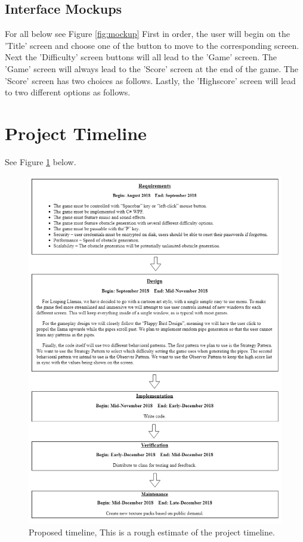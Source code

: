 \documentclass[10pt,conference,onecolumn,compsoc]{IEEEtran}
\begin{document}
\subsection{Interface Mockups}
For all below see Figure \ref{fig:mockup}
First in order, the user will begin on the 'Title' screen and choose one of the button to move to the corresponding screen. Next the 'Difficulty' screen buttons will all lead to the 'Game' screen. The 'Game' screen will always lead to the 'Score' screen at the end of the game. The 'Score' screen has two choices as follows. Lastly, the 'Highscore' screen will lead to two different options as follows.

\section{Project Timeline}
See Figure \ref{fig:timeline} below.
\begin{figure}[ht!]
\includegraphics[scale=0.5]{ProposalTimeline.png}
\caption{Proposed timeline, This is a rough estimate of the project timeline.}
\label{fig:timeline}
\end{figure}
\end{document}
